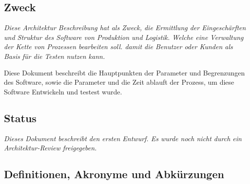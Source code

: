 \documentclass[enabledeprecatedfontcommands,fontsize=12pt,paper=a4,twoside]{scrartcl}
\begin{document}
\subsection{Zweck}

  {\em Diese Architektur Beschreibung  hat als Zweck, die Ermittlung der Eingeschärften und Struktur des Software von Produktion und Logistik. Welche eine Verwaltung der Kette von Prozessen bearbeiten soll. damit die Benutzer oder Kunden als Basis für die Testen nutzen kann.

  Diese Dokument beschreibt die Hauptpunkten der Parameter und Begrenzungen des Software, sowie die Parameter und die Zeit ablauft der Prozess, um diese Software Entwickeln und testest wurde.
  }

\subsection{Status}

{\em Dieses Dokument beschreibt den ersten Entwurf. Es wurde noch nicht durch ein
Architektur-Review freigegeben.
}



\subsection{Definitionen, Akronyme und Abkürzungen}
\end{document}
